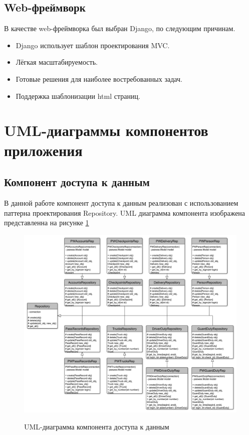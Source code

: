 \subsection{Web-фреймворк}
В качестве web-фреймворка был выбран Django\cite{django_doc}, по следующим причинам.
\begin{itemize}
	\item Django использует шаблон проектирования MVC.
	\item Лёгкая масштабируемость.
	\item Готовые решения для наиболее востребованных задач.
	\item Поддержка шаблонизации html страниц.
\end{itemize}


\newpage
\section{UML-диаграммы компонентов приложения}
\subsection{Компонент доступа к данным}
В данной работе компонент доступа к данным реализован с использованием паттерна проектирования Repository. UML диаграмма компонента изображена представленна на рисунке \ref{rep_pic} 

\begin{figure}[h!] 
	\begin{center}
		{\includegraphics[scale=0.4, angle=0]{uml/repsoitory.pdf}}
		\caption{UML-диаграмма компонента доступа к данным}
		\label{rep_pic}
	\end{center}
\end{figure}


